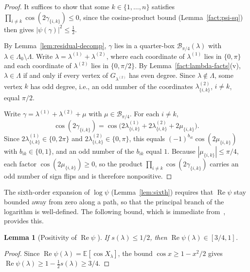 \documentclass[11pt]{article}
\newtheorem{lemma}[theorem]{Lemma}
\theoremstyle{definition}
\newcommand{\E}{\mathbb{E}}
\newcommand{\Bbox}{\mathcal{B}}
\newcommand{\RePart}{\operatorname{Re}}
\begin{document}
\begin{proof}
It suffices to show that some \(k\in\{1,\dots,n\}\) satisfies \(\prod_{i\ne k}\cos(2\gamma_{\{i,k\}})\le 0\), since the cosine-product bound (Lemma~\ref{fact:psi-sq}) then gives \(|\psi(\gamma)|^2\le \tfrac12\).

By Lemma~\ref{lem:residual-decomp}, \(\gamma\) lies in a quarter-box
\(\Bbox_{\pi/4}(\lambda)\) with \(\lambda\in\Lambda_0\setminus\Lambda\).
Write \(\lambda=\lambda^{(1)}+\lambda^{(2)}\),
where each coordinate of \(\lambda^{(1)}\) lies in \(\{0,\pi\}\) and each coordinate of
\(\lambda^{(2)}\) lies in \(\{0,\pi/2\}\). By Lemma~\ref{fact:lambda-facts}(v), \(\lambda\in\Lambda\) if and only if every vertex of \(G_{\lambda^{(2)}}\) has even degree. Since \(\lambda\notin\Lambda\), some vertex \(k\) has odd degree, i.e., an odd number of the coordinates \(\lambda^{(2)}_{\{i,k\}}\), \(i\ne k\), equal \(\pi/2\).

Write \(\gamma=\lambda^{(1)}+\lambda^{(2)}+\mu\) with \(\mu\in \Bbox_{\pi/4}\). For each \(i\ne k\),
\[
  \cos(2\gamma_{\{i,k\}})
  =
  \cos\!\bigl(2\lambda^{(1)}_{\{i,k\}}+2\lambda^{(2)}_{\{i,k\}}+2\mu_{\{i,k\}}\bigr).
\]
Since \(2\lambda^{(1)}_{\{i,k\}}\in\{0,2\pi\}\) and
\(2\lambda^{(2)}_{\{i,k\}}\in\{0,\pi\}\), this equals
\((-1)^{b_{ik}}\cos(2\mu_{\{i,k\}})\) with
\(b_{ik}\in\{0,1\}\), and an odd number of the \(b_{ik}\) equal \(1\).
Because \(|\mu_{\{i,k\}}|\le \pi/4\), each factor \(\cos(2\mu_{\{i,k\}})\ge 0\),
so the product \(\prod_{i\ne k}\cos(2\gamma_{\{i,k\}})\) carries an odd number of sign flips and is therefore nonpositive.
\end{proof}

The sixth-order expansion of \(\log\psi\) (Lemma~\ref{lem:sixth}) requires that \(\RePart\psi\) stay bounded away from zero along a path, so that the principal branch of the logarithm is well-defined. The following bound, which is immediate from~\cite[Lemma~3.1, eq.~(3.2)]{DL10}, provides this.

\begin{lemma}[Positivity of $\RePart\psi$ {\cite[Lemma~3.1]{DL10}}]\label{lem:realpart}
If \(s(\lambda)\le 1/2\), then \(\RePart\psi(\lambda)\in[3/4,1]\).
\end{lemma}

\begin{proof}
Since \(\RePart\psi(\lambda)=\E[\cos X_\lambda]\), the bound
\(\cos x\ge 1-x^2/2\) gives
\(\RePart\psi(\lambda)\ge 1-\frac12 s(\lambda)\ge 3/4\).
\end{proof}
\end{document}
